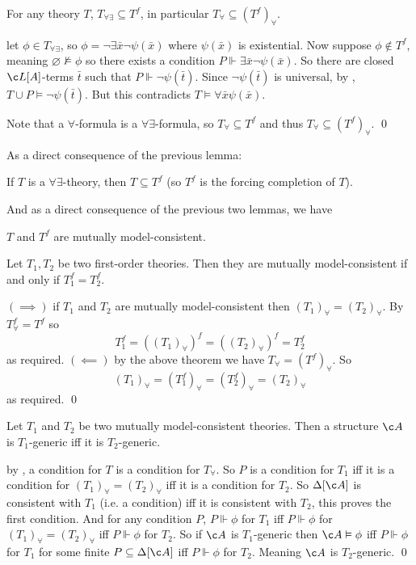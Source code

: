 \blemm

    For any theory $T$, $T_{\forall\exists}\subseteq T^f$, in particular $T_\forall\subseteq(T^f)_\forall$.

\elemm

\Proof let $\phi\in T_{\forall\exists}$, so $\phi=\neg\exists\bar x\neg\psi(\bar x)$ where $\psi(\bar x)$ is existential.
Now suppose $\phi\notin T^f$, meaning $\varnothing\nvDash\phi$ so there exists a condition $P\Vdash\exists\bar x\neg\psi(\bar x)$.
So there are closed $\c L[A]$-terms $\bar t$ such that $P\Vdash\neg\psi(\bar t)$.
Since $\neg\psi(\bar t)$ is universal, by , $T\cup P\vDash\neg\psi(\bar t)$.
But this contradicts $T\vDash\forall\bar x\psi(\bar x)$.

Note that a $\forall$-formula is a $\forall\exists$-formula, so $T_\forall\subseteq T^f$ and thus $T_\forall\subseteq(T^f)_\forall$.
\qed

As a direct consequence of the previous lemma:

\bcoro[name=coro6.1]

    If $T$ is a $\forall\exists$-theory, then $T\subseteq T^f$ (so $T^f$ is the forcing completion of $T$).

\ecoro

And as a direct consequence of the previous two lemmas, we have

\bthrm

    $T$ and $T^f$ are mutually model-consistent.

\ethrm

\bcoro

    Let $T_1,T_2$ be two first-order theories.
    Then they are mutually model-consistent if and only if $T_1^f=T_2^f$.

\ecoro

\Proof $(\implies)$ if $T_1$ and $T_2$ are mutually model-consistent then $(T_1)_\forall=(T_2)_\forall$.
By  $T_\forall^f=T^f$ so
$$ T_1^f = ((T_1)_\forall)^f = ((T_2)_\forall)^f = T_2^f $$
as required.
$(\impliedby)$ by the above theorem we have $T_\forall=(T^f)_\forall$.
So
$$ (T_1)_\forall = (T_1^f)_\forall = (T_2^f)_\forall = (T_2)_\forall $$
as required.
\qed

\bcoro

    Let $T_1$ and $T_2$ be two mutually model-consistent theories.
    Then a structure $\c A$ is $T_1$-generic iff it is $T_2$-generic.

\ecoro

\Proof by , a condition for $T$ is a condition for $T_\forall$.
So $P$ is a condition for $T_1$ iff it is a condition for $(T_1)_\forall=(T_2)_\forall$ iff it is a condition for $T_2$.
So $\Delta[\c A]$ is consistent with $T_1$ (i.e. a condition) iff it is consistent with $T_2$, this proves the first condition.
And for any condition $P$, $P\Vdash\phi$ for $T_1$ iff $P\Vdash\phi$ for $(T_1)_\forall=(T_2)_\forall$ iff $P\Vdash\phi$ for $T_2$.
So if $\c A$ is $T_1$-generic then $\c A\vDash\phi$ iff $P\Vdash\phi$ for $T_1$ for some finite $P\subseteq\Delta[\c A]$ iff $P\Vdash\phi$ for $T_2$.
Meaning $\c A$ is $T_2$-generic.
\qed

